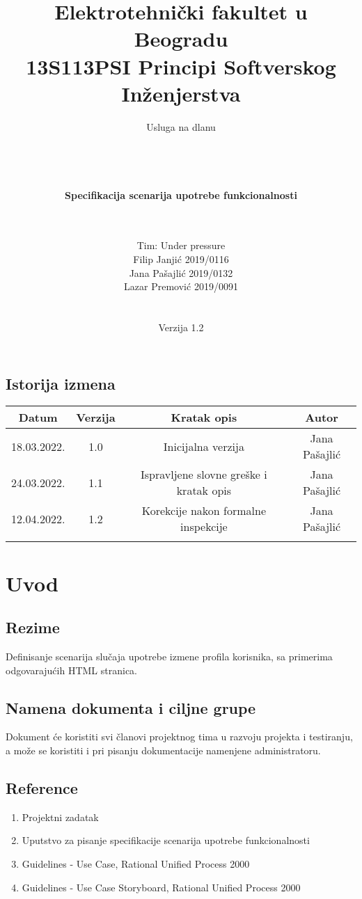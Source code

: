 \documentclass[a4paper,12pt]{report}
\title{\Large Elektrotehnički fakultet u Beogradu \\ 13S113PSI Principi Softverskog Inženjerstva}
\author{\Huge Usluga na dlanu\\ \ \\ \ \\ \ \\ \ \\
	\Large \textbf{Specifikacija scenarija upotrebe funkcionalnosti}\\\Large \textbf{\genitivfunkcionalnosti} \\ \ \\}
\date{\Large   Tim: Under pressure \\ Filip Janjić 2019/0116 \\ Jana Pašajlić 2019/0132 \\ Lazar Premović 2019/0091  \\ \  \\ \  \\\large Verzija 1.2}
\newcommand{\inicijalniautor}{Jana Pašajlić}
\newcommand{\inicijalnidatum}{18.03.2022.}
\begin{document}
\maketitle

\begin{center}
\section*{Istorija izmena}
\begin{tabular}{ |c|c|c|c| }
\hline
\textbf{Datum} & \textbf{Verzija} & \textbf{Kratak opis} & \textbf{Autor} \\ 
\hline
 \inicijalnidatum & 1.0  & Inicijalna verzija & \inicijalniautor \\
 \hline
 24.03.2022. & 1.1  & Ispravljene slovne greške i kratak opis & \inicijalniautor  \\
 \hline
 12.04.2022. & 1.2  & Korekcije nakon formalne inspekcije & \inicijalniautor  \\
 \hline
 &  &  &  \\
 \hline
\end{tabular}
\end{center}
\newpage

\tableofcontents

\newpage
\section{Uvod}
\subsection{Rezime}
    Definisanje scenarija slučaja upotrebe izmene profila korisnika, sa primerima odgovarajućih HTML stranica.
\subsection{Namena dokumenta i ciljne grupe}
    Dokument će koristiti svi članovi projektnog tima u razvoju projekta i testiranju, a može se koristiti i pri pisanju dokumentacije namenjene administratoru.
\subsection{Reference}
 \begin{enumerate}
    \item Projektni zadatak
    \item Uputstvo za pisanje specifikacije scenarija upotrebe funkcionalnosti 
    \item Guidelines - Use Case, Rational Unified Process 2000
    \item Guidelines - Use Case Storyboard, Rational Unified Process 2000
 \end{enumerate}
\end{document}
